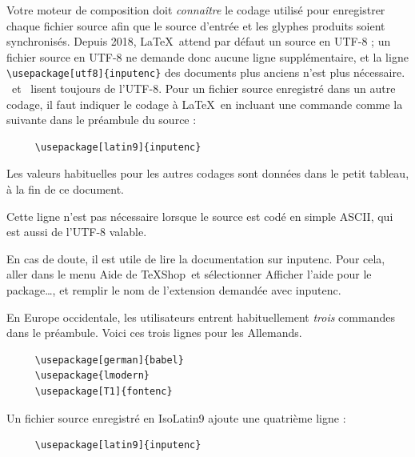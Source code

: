 \documentclass[11pt,french]{article}
\newcommand{\TS}{\textsf{\TeX Shop}}
\newcommand{\acr}[1]{\textsf{#1}}
\newcommand{\cmd}[1]{\textsf{#1}}
\newcommand{\mnu}[1]{\textsf{#1}}
\begin{document}
Votre moteur de composition doit \emph{connaître} le codage utilisé pour enregistrer chaque fichier source afin que le source d'entrée et les glyphes produits soient synchronisés. Depuis 2018, \LaTeX\ attend par défaut un source en \acr{UTF-8} ; un fichier source en \acr{UTF-8} ne demande donc aucune ligne supplémentaire, et la ligne \verb|\usepackage[utf8]{inputenc}| des documents plus anciens n'est plus nécessaire. \XeLaTeX\ et \LuaLaTeX\ lisent toujours de l'\acr{UTF-8}. Pour un fichier source enregistré dans un autre codage, il faut indiquer le codage à \LaTeX\ en incluant une commande comme la suivante dans le préambule du source :
\begin{verbatim}
     \usepackage[latin9]{inputenc}	
\end{verbatim}
Les valeurs habituelles pour les autres codages sont données dans le petit tableau, à la fin de ce document.

Cette ligne n'est pas nécessaire lorsque le source est codé en simple \acr{ASCII}, qui est aussi de l'\acr{UTF-8} valable.

En cas de doute, il est utile de lire la documentation sur \cmd{inputenc}. Pour cela, aller dans le menu \mnu{Aide} de \TS\ et sélectionner \cmd{Afficher l'aide pour le package…}, et remplir le nom de l'extension demandée avec \cmd{inputenc}.

En Europe occidentale, les utilisateurs entrent habituellement \emph{trois} commandes dans le préambule. Voici ces trois lignes pour les Allemands.
\begin{verbatim}
     \usepackage[german]{babel}
     \usepackage{lmodern}
     \usepackage[T1]{fontenc}
\end{verbatim}
Un fichier source enregistré en \acr{IsoLatin9} ajoute une quatrième ligne :
\begin{verbatim}
     \usepackage[latin9]{inputenc}
\end{verbatim}
\end{document}
